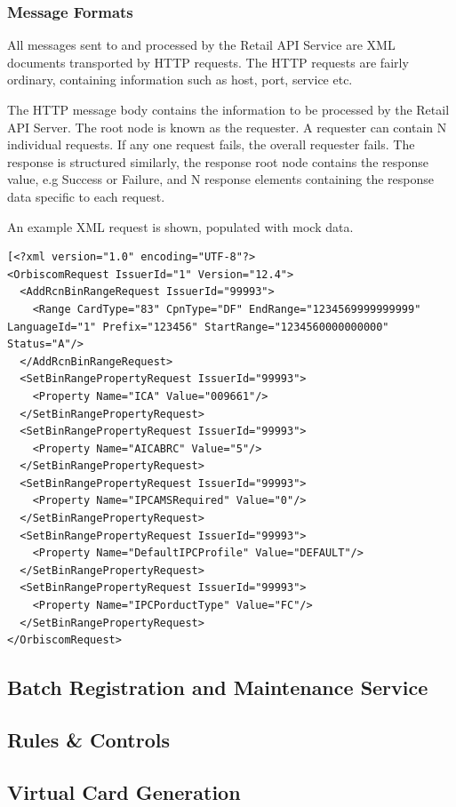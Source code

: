 \documentclass[a4paper, 11pt, titlepage]{article}
\begin{document}
\subsubsection{Message Formats}
All messages sent to and processed by the Retail API Service are XML documents transported by HTTP requests. The HTTP requests are fairly ordinary, containing information such as host, port, service etc.

The HTTP message body contains the information to be processed by the Retail API Server. The root node is known as the requester. A requester can contain N individual requests. If any one request fails, the overall requester fails. The response is structured similarly, the response root node contains the response value, e.g Success or Failure, and N response elements containing the response data specific to each request.

An example XML request is shown, populated with mock data.
\begin{verbatim}
[<?xml version="1.0" encoding="UTF-8"?>
<OrbiscomRequest IssuerId="1" Version="12.4">
  <AddRcnBinRangeRequest IssuerId="99993">
    <Range CardType="83" CpnType="DF" EndRange="1234569999999999" LanguageId="1" Prefix="123456" StartRange="1234560000000000" Status="A"/>
  </AddRcnBinRangeRequest>
  <SetBinRangePropertyRequest IssuerId="99993">
    <Property Name="ICA" Value="009661"/>
  </SetBinRangePropertyRequest>
  <SetBinRangePropertyRequest IssuerId="99993">
    <Property Name="AICABRC" Value="5"/>
  </SetBinRangePropertyRequest>
  <SetBinRangePropertyRequest IssuerId="99993">
    <Property Name="IPCAMSRequired" Value="0"/>
  </SetBinRangePropertyRequest>
  <SetBinRangePropertyRequest IssuerId="99993">
    <Property Name="DefaultIPCProfile" Value="DEFAULT"/>
  </SetBinRangePropertyRequest>
  <SetBinRangePropertyRequest IssuerId="99993">
    <Property Name="IPCPorductType" Value="FC"/>
  </SetBinRangePropertyRequest>
</OrbiscomRequest>
\end{verbatim}


\subsection{Batch Registration and Maintenance Service}

\subsection{Rules \& Controls}

\subsection{Virtual Card Generation}
\end{document}
